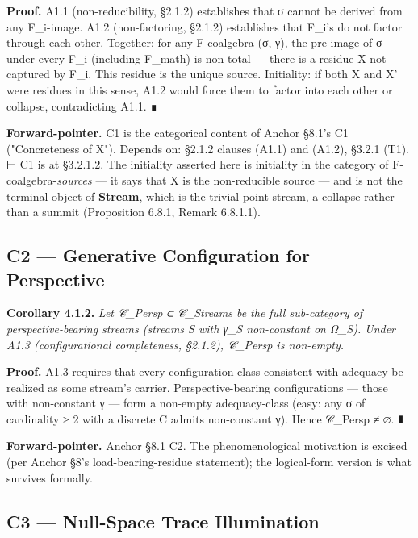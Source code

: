 \documentclass[11pt, openany]{book}
\begin{document}
\textbf{Proof.} A1.1 (non-reducibility, §2.1.2) establishes that σ cannot be derived from any F\_\allowbreak{}i-image. A1.2 (non-factoring, §2.1.2) establishes that F\_\allowbreak{}i's do not factor through each other. Together: for any F-coalgebra (σ, γ), the pre-image of σ under every F\_\allowbreak{}i (including F\_\allowbreak{}math) is non-total --- there is a residue X not captured by F\_\allowbreak{}i. This residue is the unique source. Initiality: if both X and X' were residues in this sense, A1.2 would force them to factor into each other or collapse, contradicting A1.1. ∎

\textbf{Forward-pointer.} C1 is the categorical content of Anchor §8.1's C1 ("Concreteness of X"). Depends on: §2.1.2 clauses (A1.1) and (A1.2), §3.2.1 (T1). ⊢ C1 is at §3.2.1.2. The initiality asserted here is initiality in the category of F-coalgebra-\textit{sources} --- it says that X is the non-reducible source --- and is not the terminal object of \textbf{Stream}, which is the trivial point stream, a collapse rather than a summit (Proposition 6.8.1, Remark 6.8.1.1).

\subsection{C2 --- Generative Configuration for Perspective}

\textbf{Corollary 4.1.2.} \textit{Let 𝒞\_\allowbreak{}Persp ⊂ 𝒞\_\allowbreak{}Streams be the full sub-category of perspective-bearing streams (streams S with γ\_\allowbreak{}S non-constant on Ω\_\allowbreak{}S). Under A1.3 (configurational completeness, §2.1.2), 𝒞\_\allowbreak{}Persp is non-empty.}

\textbf{Proof.} A1.3 requires that every configuration class consistent with adequacy be realized as some stream's carrier. Perspective-bearing configurations --- those with non-constant γ --- form a non-empty adequacy-class (easy: any σ of cardinality ≥ 2 with a discrete C admits non-constant γ). Hence 𝒞\_\allowbreak{}Persp ≠ ∅. ∎

\textbf{Forward-pointer.} Anchor §8.1 C2. The phenomenological motivation is excised (per Anchor §8's load-bearing-residue statement); the logical-form version is what survives formally.

\subsection{C3 --- Null-Space Trace Illumination}
\end{document}
